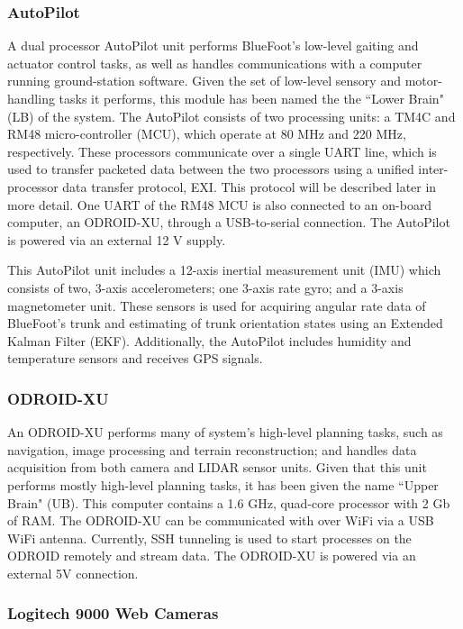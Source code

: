 			\subsubsection{AutoPilot}

				A dual processor AutoPilot unit performs BlueFoot's low-level gaiting and actuator control tasks, as well as handles communications with a computer running ground-station software. Given the set of low-level sensory and motor-handling tasks it performs, this module has been named the the ``Lower Brain" (LB) of the system. The AutoPilot consists of two processing units: a TM4C and RM48 micro-controller (MCU), which operate at 80 MHz and 220 MHz, respectively. These processors communicate over a single UART line, which is used to transfer packeted data between the two processors using a unified inter-processor data transfer protocol, EXI. This protocol will be described later in more detail. One UART of the RM48 MCU is also connected to an on-board computer, an ODROID-XU, through a USB-to-serial connection. The AutoPilot is powered via an external 12 V supply.
	
				This AutoPilot unit includes a 12-axis inertial measurement unit (IMU) which consists of two, 3-axis accelerometers; one 3-axis rate gyro; and a 3-axis magnetometer unit. These sensors is used for acquiring angular rate data of BlueFoot's trunk and estimating of trunk orientation states using an Extended Kalman Filter (EKF). Additionally, the AutoPilot includes humidity and temperature sensors and receives GPS signals.
				
			\subsubsection{ODROID-XU}

				An ODROID-XU performs many of system's high-level planning tasks, such as navigation, image processing and terrain reconstruction; and handles data acquisition from both camera and LIDAR sensor units. Given that this unit performs mostly high-level planning tasks, it has been given the name ``Upper Brain" (UB). This computer contains a 1.6 GHz, quad-core processor with 2 Gb of RAM. The ODROID-XU can be communicated with over WiFi via a USB WiFi antenna. Currently, SSH tunneling is used to start processes on the ODROID remotely and stream data. The ODROID-XU is powered via an external 5V connection.

			\subsubsection{Logitech 9000 Web Cameras}

